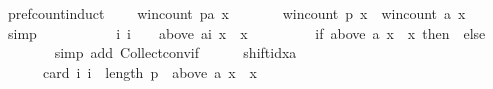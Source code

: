 \begin{isabellebody}
\ pref{\isacharunderscore}{\kern0pt}count{\isacharunderscore}{\kern0pt}induct{\isacharcolon}{\kern0pt}\isanewline
\ \ \ \ {\isachardoublequoteopen}win{\isacharunderscore}{\kern0pt}count\ {\isacharparenleft}{\kern0pt}p{\isacharat}{\kern0pt}{\isacharbrackleft}{\kern0pt}a{\isacharbrackright}{\kern0pt}{\isacharparenright}{\kern0pt}\ x\ {\isacharequal}{\kern0pt}\isanewline
\ \ \ \ \ \ win{\isacharunderscore}{\kern0pt}count\ p\ x\ {\isacharplus}{\kern0pt}\ win{\isacharunderscore}{\kern0pt}count\ {\isacharbrackleft}{\kern0pt}a{\isacharbrackright}{\kern0pt}\ x{\isachardoublequoteclose}\isanewline
\ \ \isamarkupfalse%
\ {\isacharparenleft}{\kern0pt}simp{\isacharparenright}{\kern0pt}\isanewline
\ \ \ \ \isamarkupfalse%
\isanewline
\ \ \ \ \ \ {\isachardoublequoteopen}{\isacharbraceleft}{\kern0pt}i{\isachardot}{\kern0pt}\ i\ {\isacharequal}{\kern0pt}\ {}\ {\isasymand}\ {\isacharparenleft}{\kern0pt}above\ {\isacharparenleft}{\kern0pt}{\isacharbrackleft}{\kern0pt}a{\isacharbrackright}{\kern0pt}{\isacharbang}{\kern0pt}i{\isacharparenright}{\kern0pt}\ x\ {\isacharequal}{\kern0pt}\ {\isacharbraceleft}{\kern0pt}x{\isacharbraceright}{\kern0pt}{\isacharparenright}{\kern0pt}{\isacharbraceright}{\kern0pt}\ {\isacharequal}{\kern0pt}\isanewline
\ \ \ \ \ \ \ \ {\isacharparenleft}{\kern0pt}if\ {\isacharparenleft}{\kern0pt}above\ a\ x\ {\isacharequal}{\kern0pt}\ {\isacharbraceleft}{\kern0pt}x{\isacharbraceright}{\kern0pt}{\isacharparenright}{\kern0pt}\ then\ {\isacharbraceleft}{\kern0pt}{}{\isacharbraceright}{\kern0pt}\ else\ {\isacharbraceleft}{\kern0pt}{\isacharbraceright}{\kern0pt}{\isacharparenright}{\kern0pt}{\isachardoublequoteclose}\isanewline
\ \ \ \ \ \ \isamarkupfalse%
\ {\isacharparenleft}{\kern0pt}simp\ add{\isacharcolon}{\kern0pt}\ Collect{\isacharunderscore}{\kern0pt}conv{\isacharunderscore}{\kern0pt}if{\isacharparenright}{\kern0pt}\isanewline
\ \ \ \ \isamarkupfalse%
\ shift{\isacharunderscore}{\kern0pt}idx{\isacharunderscore}{\kern0pt}a{\isacharcolon}{\kern0pt}\isanewline
\ \ \ \ \ \ {\isachardoublequoteopen}card\ {\isacharbraceleft}{\kern0pt}i{\isachardot}{\kern0pt}\ i\ {\isacharequal}{\kern0pt}\ length\ p\ {\isasymand}\ {\isacharparenleft}{\kern0pt}above\ {\isacharparenleft}{\kern0pt}{\isacharbrackleft}{\kern0pt}a{\isacharbrackright}{\kern0pt}{\isacharbang}{\kern0pt}{}{\isacharparenright}{\kern0pt}\ x\ {\isacharequal}{\kern0pt}\ {\isacharbraceleft}{\kern0pt}x{\isacharbraceright}{\kern0pt}{\isacharparenright}{\kern0pt}{\isacharbraceright}{\kern0pt}\ {\isacharequal}{\kern0pt}\isanewline

\end{isabellebody}
